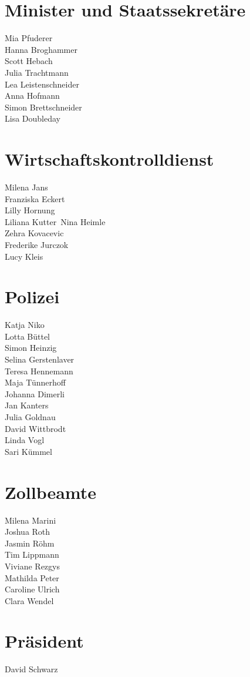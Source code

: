\documentclass[12pt, twocolumn]{article}
\begin{document}
\section*{Minister und Staatssekretäre}
Mia Pfuderer\\
Hanna Broghammer\\
Scott Hebach\\
Julia Trachtmann\\
Lea Leistenschneider\\
Anna Hofmann\\
Simon Brettschneider\\
Lisa Doubleday\\

\section*{Wirtschaftskontrolldienst}
Milena Jans\\
Franziska Eckert\\
Lilly Hornung\\
Liliana Kutter\
Nina Heimle\\
Zehra Kovacevic\\
Frederike Jurczok\\
Lucy Kleis

\section*{Polizei}
Katja Niko\\
Lotta Büttel\\
Simon Heinzig\\
Selina Gerstenlaver\\
Teresa Hennemann\\
Maja Tünnerhoff\\
Johanna Dimerli\\
Jan Kanters\\
Julia Goldnau\\
David Wittbrodt\\
Linda Vogl\\
Sari Kümmel

\section*{Zollbeamte}
Milena Marini\\
Joshua Roth\\
Jasmin Röhm\\
Tim Lippmann\\
Viviane Rezgys\\
Mathilda Peter\\
Caroline Ulrich\\
Clara Wendel

\section*{Präsident}
David Schwarz
\end{document}
